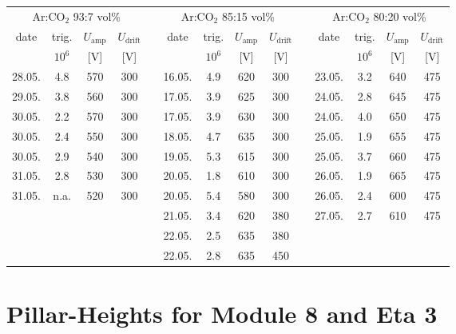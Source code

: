 \documentclass[
twoside,            %
BCOR1.4cm,          %
10pt,               %
headings=normal,    %
headsepline,        %
clearplainpage,		%
final,              %
div=14,
open=right,
bibliography=toc
]{scrreprt}
\begin{document}
\begin{table}[!h]
	\centering
	\setlength{\tabcolsep}{3pt}
				
	\begin{tabular}{cccccccccccccc}
		\hline
		\hline
		\multicolumn{4}{c}{Ar:CO$_{2}$ 93:7 vol\%} & \hspace{6mm} & \multicolumn{4}{c}{Ar:CO$_{2}$ 85:15 vol\%} & \hspace{6mm} & \multicolumn{4}{c}{Ar:CO$_{2}$ 80:20 vol\%}
		\\
		date & trig. & $U_{\mathrm{amp}}$ & $U_{\mathrm{drift}}$ & &
		date & trig. & $U_{\mathrm{amp}}$ & $U_{\mathrm{drift}}$ & &
		date & trig. & $U_{\mathrm{amp}}$ & $U_{\mathrm{drift}}$
		\\
		 & $10^{6}$ & [V] & [V] & &
		 & $10^{6}$ & [V] & [V] & &
		 & $10^{6}$ & [V] & [V]
		\\
		\hline
		28.05. & 4.8 & 570 & 300 & &
		16.05. & 4.9 & 620 & 300 & &
		23.05. & 3.2 & 640 & 475 
		\\
		29.05. & 3.8 & 560 & 300 & &
		17.05. & 3.9 & 625 & 300 & &
		24.05. & 2.8 & 645 & 475 
		\\
		30.05. & 2.2 & 570 & 300 & &
		17.05. & 3.9 & 630 & 300 & &
		24.05. & 4.0 & 650 & 475 
		\\
		30.05. & 2.4 & 550 & 300 & &
		18.05. & 4.7 & 635 & 300 & &
		25.05. & 1.9 & 655 & 475 
		\\
		30.05. & 2.9 & 540 & 300 & &
		19.05. & 5.3 & 615 & 300 & &
		25.05. & 3.7 & 660 & 475 
		\\
		31.05. & 2.8 & 530 & 300 & &
		20.05. & 1.8 & 610 & 300 & &
		26.05. & 1.9 & 665 & 475 
		\\
		31.05. & n.a. & 520 & 300 & &
		20.05. & 5.4 & 580 & 300 & &
		26.05. & 2.4 & 600 & 475 
		\\
		 &  &  &  & &
		21.05. & 3.4 & 620 & 380 & &
		27.05. & 2.7 & 610 & 475 
		\\
		 &  &  &  & &
		22.05. & 2.5 & 635 & 380 & &
		 &  &  &  
		\\
		 &  &  &  & &
		22.05. & 2.8 & 635 & 450 & &
		 &  &  &  
		\\
		\hline
		\hline
	\end{tabular}
	
	\setlength{\tabcolsep}{6pt}
\end{table}
	
\section{Pillar-Heights for Module 8 and Eta 3}
\end{document}
